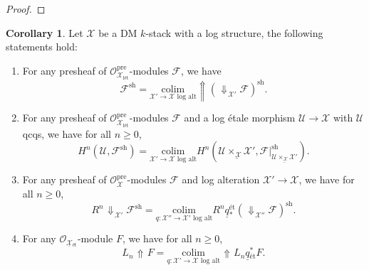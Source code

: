 \documentclass[11pt]{amsart}
\theoremstyle{definition}
\theoremstyle{definition}
\newtheorem{corollary}[theorem]{Corollary}
\DeclareMathOperator{\arrowup}{\!\Uparrow \!}
\DeclareMathOperator{\arrowdown}{\!\Downarrow\!}
\newcommand{\cF}{\mathcal{F}}
\newcommand{\cU}{\mathcal{U}}
\newcommand{\cX}{\mathcal{X}}
\newcommand{\cal}{\mathcal}
\def\cF{{\cal F}}
\def\cU{{\cal U}}
\def\cX{{\cal X}}
\begin{document}
\begin{proof}
%
\end{proof}
\begin{corollary}\label{Key corollary}
Let $\cX$ be a DM $k$-stack with a log structure, the following statements hold:
\begin{enumerate}
\item\label{item-1-key corollary} For any presheaf of $\mathcal{O}_{\cX_{\text{l\'et}}}^{\text{pre}}$-modules $\mathcal{F}$, we have
    \[\mathcal{F}^{\text{sh}}=\underset{\cX'\rightarrow \cX\text{ log alt}}{\mathrm{colim}}\Uparrow\!\! (\arrowdown_{\cX'}\mathcal{F})^{\text{sh}}.\]
\item\label{item-2-key-corollary} For any presheaf of $\mathcal{O}_{\cX_{\text{l\'et}}}^{\text{pre}}$-modules $\mathcal{F}$ and a log \'etale morphism $\cU\rightarrow \cX$ with $\cU$ qcqs, we have for all $n\geq 0$,
\[H^{n}(\cU,\mathcal{F}^{\text{sh}})=\underset{\cX'\rightarrow \cX\text{ log alt}}{\mathrm{colim}}H^{n}(\underline{\cU\times_\cX \cX'},\mathcal{F}|_{\underline{\cU\times_\cX \cX'}}^{\text{sh}}).\]
\item\label{item-3-key-corollary} For any presheaf of $\mathcal{O}_{\cX}^{\text{pre}}$-modules $\cF$ and log alteration $\cX'\rightarrow \cX$, we have for all $n\geq 0$, 
\[R^n\arrowdown_{\cX'}\cF^{\text{sh}}=\underset{q\colon \cX''\rightarrow \cX'\text{ log alt}}{\mathrm{colim}}R^{n}\underline{q}{}^{\text{\'et}}_{*}(\arrowdown_{\cX''}\mathcal{F})^{\text{sh}}.\]
\item\label{item-4-key-corollary} For any $\mathcal{O}_{\underline{\cX}{}_{\text{\'et}}}$-module $F$, we have for all $n\geq 0$,
\[L_n\arrowup F=\underset{q\colon \cX'\rightarrow \cX\text{ log alt}}{\mathrm{colim}}\arrowup L_{n}\underline{q
}{}_{\text{\'et}}^{*}F.\]
\end{enumerate}
\end{corollary}
\end{document}
